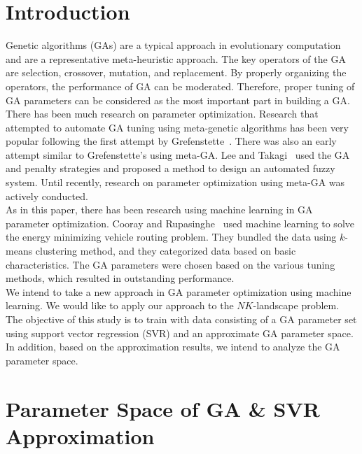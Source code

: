 \section{Introduction}
  \label{sec:introduction}
  Genetic algorithms (GAs) are a typical approach in evolutionary computation and are a representative meta-heuristic approach. The key operators of the GA are selection, crossover, mutation, and replacement. By properly organizing the operators, the performance of GA can be moderated. Therefore, proper tuning of GA parameters can be considered as the most important part in building a GA. \\
  There has been much research on parameter optimization. Research that attempted to automate GA tuning using meta-genetic algorithms has been very popular following the first attempt by Grefenstette~\cite{grefenstette1986optimization}. There was also an early attempt similar to Grefenstette's using meta-GA. Lee and Takagi~\cite{lee1993integrating} used the GA and penalty strategies and proposed a method to design an automated fuzzy system. Until recently, research on parameter optimization using meta-GA was actively conducted. \\
  As in this paper, there has been research using machine learning in GA parameter optimization. Cooray and Rupasinghe~\cite{cooray2017machine} used machine learning to solve the energy minimizing vehicle routing problem. They bundled the data using $k$-means clustering method, and they categorized data based on basic characteristics. The GA parameters were chosen based on the various tuning methods, which resulted in outstanding performance. \\
  We intend to take a new approach in GA parameter optimization using machine learning. We would like to apply our approach to the $NK$-landscape problem. The objective of this study is to train with data consisting of a GA parameter set using support vector regression (SVR) and an approximate GA parameter space. In addition, based on the approximation results, we intend to analyze the GA parameter space.


\section{Parameter Space of GA \& SVR Approximation}
  \label{sec:parameter-svr}
